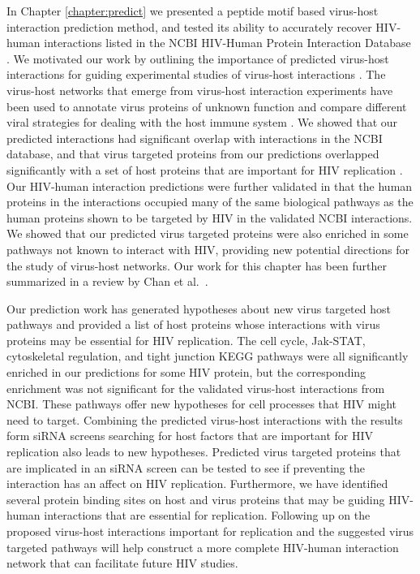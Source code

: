 In Chapter \ref{chapter:predict} we presented a peptide motif based
virus-host interaction prediction method, and tested its ability to
accurately recover HIV-human interactions listed in the NCBI HIV-Human
Protein Interaction Database \cite{fu09,ptak08}. We motivated our work
by outlining the importance of predicted virus-host interactions for
guiding experimental studies of virus-host interactions
\cite{skrabanek2008computational,jansen2003bayesian,lee2004probabilistic}. The
virus-host networks that emerge from virus-host interaction
experiments have been used to annotate virus proteins of unknown
function and compare different viral strategies for dealing with the
host immune system \cite{navratil-system,calderwood07}. We showed that
our predicted interactions had significant overlap with interactions in
the NCBI database, and that virus targeted proteins from our
predictions overlapped significantly with a set of host proteins that
are important for HIV replication \cite{bushman09}. Our HIV-human
interaction predictions were further validated in that the human
proteins in the interactions occupied many of the same biological
pathways as the human proteins shown to be targeted by HIV in the
validated NCBI interactions. We showed that our predicted virus
targeted proteins were also enriched in some pathways not known to interact
with HIV, providing new potential directions for the study of
virus-host networks. Our work for this chapter has been further
summarized in a review by Chan et al.\ \cite{chan09}.

Our prediction work has generated hypotheses about new virus targeted
host pathways and provided a list of host proteins whose interactions
with virus proteins may be essential for HIV replication. The cell
cycle, Jak-STAT, cytoskeletal regulation, and tight junction KEGG
pathways were all significantly enriched in our predictions for some
HIV protein, but the corresponding enrichment was not significant for
the validated virus-host interactions from NCBI. These pathways offer
new hypotheses for cell processes that HIV might need to
target. Combining the predicted virus-host interactions with the
results form siRNA screens searching for host factors that are
important for HIV replication also leads to new hypotheses. Predicted
virus targeted proteins that are implicated in an siRNA screen can be
tested to see if preventing the interaction has an affect on HIV
replication.  Furthermore, we have identified several protein binding
sites on host and virus proteins that may be guiding HIV-human
interactions that are essential for replication. Following up on the
proposed virus-host interactions important for replication and the
suggested virus targeted pathways will help construct a more complete
HIV-human interaction network that can facilitate future HIV studies.

